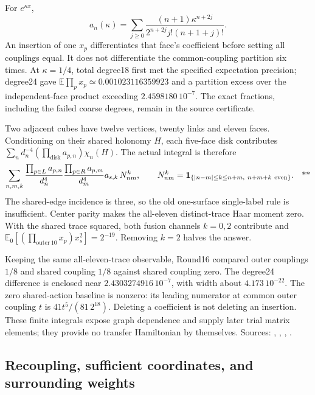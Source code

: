 For \(e^{\kappa x}\),
\[
 a_n(\kappa)=\sum_{j\ge0}
 \frac{(n+1)\kappa^{n+2j}}
 {2^{n+2j}j!(n+1+j)!}.
\]
An insertion of one \(x_p\) differentiates that face's coefficient before
setting all couplings equal. It does not differentiate the common-coupling
partition six times. At \(\kappa=1/4\), total degree18 first met the
specified expectation precision; degree24 gave
\(\mathbb E\prod_px_p\simeq0.001023116359923\) and a partition excess over
the independent-face product exceeding \(2.4598180\,10^{-7}\).
The exact fractions, including the failed coarse degrees, remain in the
source certificate.

Two adjacent cubes have twelve vertices, twenty links and eleven faces.
Conditioning on their shared holonomy \(H\), each five-face disk contributes
\(\sum_n d_n^{-4}(\prod_{\mathrm{disk}}a_{p,n})\chi_n(H)\).
The actual integral is therefore
\begin{equation}
 \sum_{n,m,k}
 \frac{\prod_{p\in L}a_{p,n}}{d_n^4}
 \frac{\prod_{p\in R}a_{p,m}}{d_m^4}
 a_{s,k}\,N_{nm}^{k},
 \qquad
 N_{nm}^{k}=\mathbf1_{\{|n-m|\le k\le n+m,\ n+m+k\ {\rm even}\}}.
 \quad\text{**}
 \label{eq:middle-two-cube}
\end{equation}
The shared-edge incidence is three, so the old one-surface single-label
rule is insufficient. Center parity makes the all-eleven distinct-trace
Haar moment zero. With the shared trace squared, both fusion channels
\(k=0,2\) contribute and
\(\mathbb E_0[(\prod_{\mathrm{outer}\ 10}x_p)x_s^2]=2^{-19}\).
Removing \(k=2\) halves the answer.

Keeping the same all-eleven-trace observable, Round16 compared outer
couplings \(1/8\) and shared coupling \(1/8\) against shared coupling zero.
The degree24 difference is enclosed near \(2.4303274916\,10^{-7}\),
with width about \(4.173\,10^{-22}\). The zero shared-action baseline is
nonzero: its leading numerator at common outer coupling \(t\) is
\(41t^5/(81\,2^{18})\). Deleting a coefficient is not deleting an insertion.
These finite integrals expose graph dependence and supply later trial
matrix elements; they provide no transfer Hamiltonian by themselves.
Sources: ,
,
,
.

\subsection{Recoupling, sufficient coordinates, and surrounding weights \workstar}
\label{sec:middle-conditional}


